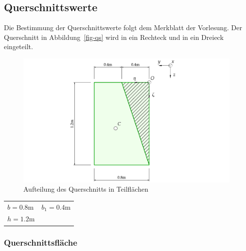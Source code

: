\documentclass[
  12pt,
  letterpaper,
  DIV=11,
  egregdoesnotlikesansseriftitles]{scrartcl}
\begin{document}
\newpage{}

\hypertarget{querschnittswerte}{%
\subsection{Querschnittswerte}\label{querschnittswerte}}

Die Bestimmung der Querschnittswerte folgt dem Merkblatt der Vorlesung.
Der Querschnitt in Abbildung~\ref{fig-qs} wird in ein Rechteck und in
ein Dreieck eingeteilt.

\begin{figure}[H]

{\centering \includegraphics{BSI_HS23_Testat_03_files/mediabag/../images/Testat_03_HS23_QS_aufteilung.pdf}

}

\caption{Aufteilung des Querschnitts in Teilflächen}

\end{figure}

\begin{longtable}[]{@{}
  >{\raggedright\arraybackslash}p{}
  >{\raggedright\arraybackslash}p{}@{}}
\toprule\noalign{}
\endhead
\bottomrule\noalign{}
\endlastfoot
\(b = 0.8 \text{m}\) & \(b_{1} = 0.4 \text{m}\) \\
\(h = 1.2 \text{m}\) & \\
\end{longtable}

\hypertarget{querschnittsfluxe4che}{%
\subsubsection{Querschnittsfläche}\label{querschnittsfluxe4che}}
\end{document}
